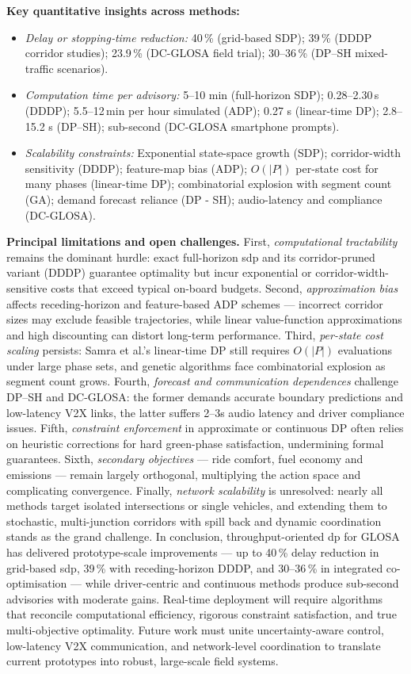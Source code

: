 \mynewline
\textbf{Key quantitative insights across methods:}
\begin{itemize}
  \item \emph{Delay or stopping‐time reduction:} 40\,\% (grid-based SDP); 39\,\% (DDDP corridor studies); 23.9\,\% (DC-GLOSA field trial); 30–36\,\% (DP–SH mixed-traffic scenarios).
  \item \emph{Computation time per advisory:} 5–10 min (full-horizon SDP); 0.28–2.30\,s (DDDP); 5.5–12\,min per hour simulated (ADP); 0.27 s (linear-time DP); 2.8–15.2 s (DP–SH); sub-second (DC-GLOSA smartphone prompts).
  \item \emph{Scalability constraints:} Exponential state-space growth (SDP); corridor-width sensitivity (DDDP); feature-map bias (ADP); $O(|P|)$ per-state cost for many phases (linear-time DP); combinatorial explosion with segment count (GA); demand forecast reliance (DP - SH); audio-latency and compliance (DC-GLOSA).
\end{itemize}
\mynewline
\textbf{Principal limitations and open challenges.} First, \emph{computational tractability} remains the dominant hurdle: exact full-horizon \ac{sdp} and its corridor-pruned variant (DDDP) guarantee optimality but incur exponential or corridor-width-sensitive costs that exceed typical on-board budgets. Second, \emph{approximation bias} affects receding-horizon and feature-based ADP schemes --- incorrect corridor sizes may exclude feasible trajectories, while linear value‐function approximations and high discounting can distort long-term performance. Third, \emph{per-state cost scaling} persists: Samra et al.’s linear-time DP still requires $O(|P|)$ evaluations under large phase sets, and genetic algorithms face combinatorial explosion as segment count grows. Fourth, \emph{forecast and communication dependences} challenge DP–SH and DC-GLOSA: the former demands accurate boundary predictions and low-latency V2X links, the latter suffers 2–3s audio latency and driver compliance issues. Fifth, \emph{constraint enforcement} in approximate or continuous DP often relies on heuristic corrections for hard green-phase satisfaction, undermining formal guarantees. Sixth, \emph{secondary objectives} --- ride comfort, fuel economy and emissions --- remain largely orthogonal, multiplying the action space and complicating convergence. Finally, \emph{network scalability} is unresolved: nearly all methods target isolated intersections or single vehicles, and extending them to stochastic, multi-junction corridors with spill back and dynamic coordination stands as the grand challenge.
\mynewline
In conclusion, throughput-oriented \ac{dp} for GLOSA has delivered prototype-scale improvements --- up to 40\,\% delay reduction in grid-based \ac{sdp}, 39\,\% with receding-horizon DDDP, and 30–36\,\% in integrated co-optimisation --- while driver-centric and continuous methods produce sub-second advisories with moderate gains. Real-time deployment will require algorithms that reconcile computational efficiency, rigorous constraint satisfaction, and true multi-objective optimality. Future work must unite uncertainty-aware control, low-latency V2X communication, and network-level coordination to translate current prototypes into robust, large-scale field systems.
